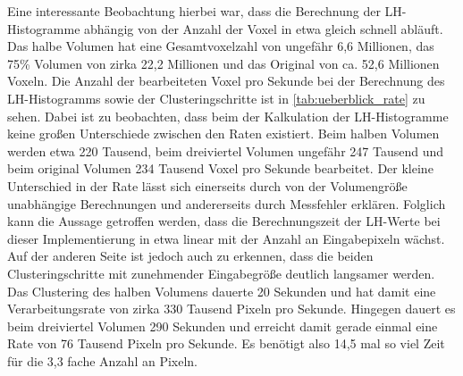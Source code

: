 Eine interessante Beobachtung hierbei war, dass die Berechnung der LH-Histogramme abhängig von der Anzahl der Voxel in etwa gleich schnell abläuft. Das halbe Volumen hat eine Gesamtvoxelzahl von ungefähr 6,6 Millionen, das 75\% Volumen von zirka 22,2 Millionen und das Original von ca. 52,6 Millionen Voxeln.
Die Anzahl der bearbeiteten Voxel pro Sekunde bei der Berechnung des LH-Histogramms sowie der Clusteringschritte ist in \autoref{tab:ueberblick_rate} zu sehen.
\newline
Dabei ist zu beobachten, dass beim der Kalkulation der LH-Histogramme keine großen Unterschiede zwischen den Raten existiert.
Beim halben Volumen werden etwa 220 Tausend, beim dreiviertel Volumen ungefähr 247 Tausend und beim original Volumen 234 Tausend Voxel pro Sekunde bearbeitet. Der kleine Unterschied in der Rate lässt sich einerseits durch von der Volumengröße unabhängige Berechnungen und andererseits durch Messfehler erklären. Folglich kann die Aussage getroffen werden, dass die Berechnungszeit der LH-Werte bei dieser Implementierung in etwa linear mit der Anzahl an Eingabepixeln wächst.
\newline
Auf der anderen Seite ist jedoch auch zu erkennen, dass die beiden Clusteringschritte mit zunehmender Eingabegröße deutlich langsamer werden. Das Clustering des halben Volumens dauerte 20 Sekunden und hat damit eine Verarbeitungsrate von zirka 330 Tausend Pixeln pro Sekunde. Hingegen dauert es beim dreiviertel Volumen 290 Sekunden und erreicht damit gerade einmal eine Rate von 76 Tausend Pixeln pro Sekunde. Es benötigt also 14,5 mal so viel Zeit für die 3,3 fache Anzahl an Pixeln.















































